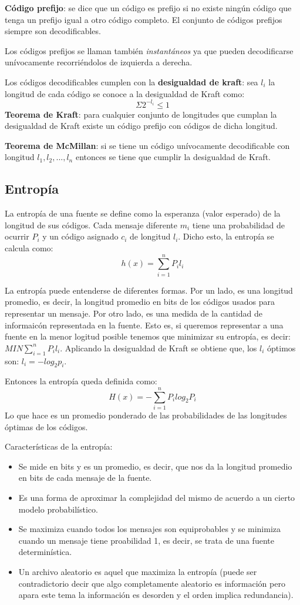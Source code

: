 \documentclass[titlepage,a4paper]{article}
\begin{document}
\textbf{Código prefijo}: se dice que un código es prefijo si no existe ningún código que tenga un prefijo igual a otro código completo.  El conjunto de códigos prefijos siempre son decodificables. 

Los códigos prefijos se llaman también \textit{instantáneos} ya que pueden decodificarse unívocamente recorriéndolos de izquierda a derecha. 

Los códigos decodificables cumplen con la \textbf{desigualdad de kraft}: sea $l_i$ la longitud de cada código se conoce a la desigualdad de Kraft como: $$\Sigma 2^{-l_i} \leq 1$$
\textbf{Teorema de Kraft}: para cualquier conjunto de longitudes que cumplan la desigualdad de Kraft existe un código prefijo con códigos de dicha longitud. 

\textbf{Teorema de McMillan}: si se tiene un código unívocamente decodificable con longitud $l_1, l_2, ... , l_n$ entonces se tiene que cumplir la desigualdad de Kraft. 

\subsection*{Entropía}
La entropía de una fuente se define como la esperanza (valor esperado) de la longitud de sus códigos. Cada mensaje diferente $m_i$ tiene una probabilidad de ocurrir $P_i$ y un código asignado $c_i$ de longitud $l_i$. Dicho esto, la entropía se calcula como: $$h(x) = \sum_{i=1}^{n} P_il_i$$

La entropía puede entenderse de diferentes formas. Por un lado, es una longitud promedio, es decir, la longitud promedio en bits de los códigos usados para representar un mensaje. Por otro lado, es una medida de la cantidad de informaicón representada en la fuente. Esto es, si queremos representar a una fuente en la menor logitud posible tenemos que minimizar su entropía, es decir: $MIN \sum_{i=1}^{n} P_il_i$. Aplicando la desigualdad de Kraft se obtiene que, los $l_i$ óptimos son: $l_i = -log_2p_i$. 

Entonces la entropía queda definida como: $$H(x) = -\sum_{i=1}^{n} P_ilog_2P_i$$
Lo que hace es un promedio ponderado de las probabilidades de las longitudes óptimas de los códigos. 

Características de la entropía:
\begin{itemize}
\item Se mide en bits y es un promedio, es decir, que nos da la longitud promedio en bits de cada mensaje de la fuente. 
\item Es una forma de aproximar la complejidad del mismo de acuerdo a un cierto modelo probabilístico.
\item Se  maximiza cuando todos los mensajes son equiprobables y se minimiza cuando un mensaje tiene proabilidad 1, es decir, se trata de una fuente determinística. 
\item Un archivo aleatorio es aquel que maximiza la entropía (puede ser contradictorio decir que algo completamente aleatorio es información pero apara este tema la información es desorden y el orden implica redundancia).
\end{itemize}
\end{document}
